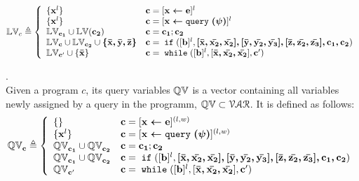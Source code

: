 %
\begin{defn}
$$
  \lvar_{c} \triangleq
  \left\{
  \begin{array}{ll}
      \{\ssa{x}^l\}                   
      & \ssa{c} = [\ssa{\assign x e}]^{l} 
      \\
      \{\ssa{x}^l\}                   
      & \ssa{c} = [\ssa{\assign x \query(\qexpr)}]^{l} 
      \\
      \lvar_{\ssa{c_1}} \cup \lvar{(\ssa{c_2})}  
      & \ssa{c} = \ssa{c_1};\ssa{c_2}
      \\
      \lvar_{\ssa{c}} \cup \lvar_{\ssa{c_2}} \cup \ssa{\{\bar{x}, \bar{y}, \bar{z}\}} 
      & \ssa{c} =\eif([\sbexpr]^{l} , \ssa{[\bar{x}, \bar{x_2}, \bar{x_2}], 
      [\bar{y}, \bar{y_2}, \bar{y_3}], 
      [\bar{z}, \bar{z_2}, \bar{z_3}], c_1, c_2}) 
      \\
      \lvar_{\ssa{c}'} \cup \{\ssa{\bar{x}}\}
      & \ssa{c}   = \ewhile ([\sbexpr]^{l}, [\ssa{\bar{x}, \bar{x_2}, \bar{x_2}}], \ssa{c}')
\end{array}
\right.
$$
\end{defn}
%
\begin{defn}.
\\
Given a program $c$, its query variables $\mathbb{QV}$ is a vector containing all variables newly assigned by a query in the programm, $\mathbb{QV} \subset \mathcal{VAR}$.
It is defined as follows:
$$
  \qvar_{\ssa{c}} \triangleq
  \left\{
  \begin{array}{ll}
      \{\}                  
      & \ssa{c} = [\ssa{\assign x e}]^{(l, w)} 
      \\
      \{\ssa{x}^l\}                  
      & \ssa{c} = [\ssa{\assign x \query(\qexpr)}]^{(l, w)} 
      \\
      \qvar_{\ssa{c_1}} \cup \qvar_{\ssa{c_2}}  
      & \ssa{c} = \ssa{c_1};\ssa{c_2}
      \\
      \qvar_{\ssa{c_1}} \cup \qvar_{\ssa{c_2}} 
      & \ssa{c} =\eif([\sbexpr]^{l} , \ssa{[\bar{x}, \bar{x_2}, \bar{x_2}], 
      [\bar{y}, \bar{y_2}, \bar{y_3}], 
      [\bar{z}, \bar{z_2}, \bar{z_3}], c_1, c_2}) 
      \\
      \qvar_{\ssa{c}'}
      & \ssa{c}   = \ewhile ([\sbexpr]^{l}, [\ssa{\bar{x}, \bar{x_2}, \bar{x_2}}], \ssa{c}')
\end{array}
\right.
$$
\end{defn}
